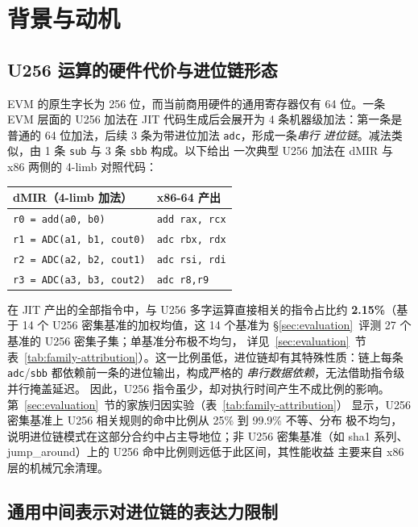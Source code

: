 \section{背景与动机}
\label{sec:problem}

\subsection{U256 运算的硬件代价与进位链形态}

EVM 的原生字长为 256 位，而当前商用硬件的通用寄存器仅有 64 位。一条
EVM 层面的 U256 加法在 JIT 代码生成后会展开为 4 条机器级加法：第一条是
普通的 64 位加法，后续 3 条为带进位加法 \texttt{adc}，形成一条\emph{串行
进位链}。减法类似，由 1 条 \texttt{sub} 与 3 条 \texttt{sbb} 构成。以下给出
一次典型 U256 加法在 dMIR 与 x86 两侧的 4-limb 对照代码：

\begin{center}
\small
\begin{tabular}{@{}l|l@{}}
\textbf{dMIR（4-limb 加法）} & \textbf{x86-64 产出} \\
\hline
\texttt{r0 = add(a0, b0)}   & \texttt{add rax, rcx}  \\
\texttt{r1 = ADC(a1, b1, cout0)} & \texttt{adc rbx, rdx}  \\
\texttt{r2 = ADC(a2, b2, cout1)} & \texttt{adc rsi, rdi}  \\
\texttt{r3 = ADC(a3, b3, cout2)} & \texttt{adc r8,\enspace r9} \\
\end{tabular}
\end{center}

在 JIT 产出的全部指令中，与 U256 多字运算直接相关的指令占比约
\textbf{2.15\%}（基于 14 个 U256 密集基准的加权均值，这 14 个基准为
§\ref{sec:evaluation}~评测 27 个基准的 U256 密集子集；单基准分布极不均匀，
详见~\ref{sec:evaluation}~节表~\ref{tab:family-attribution}）。这一比例虽低，进位链却有其特殊性质：链上每条
\texttt{adc}/\texttt{sbb} 都依赖前一条的进位输出，构成严格的
\emph{串行数据依赖}，无法借助指令级并行掩盖延迟。
因此，U256 指令虽少，却对执行时间产生不成比例的影响。
第~\ref{sec:evaluation}~节的家族归因实验（表~\ref{tab:family-attribution}）
显示，U256 密集基准上 U256 相关规则的命中比例从 25\% 到 99.9\% 不等、分布
极不均匀，说明进位链模式在这部分合约中占主导地位；非 U256 密集基准（如
sha1 系列、jump\_around）上的 U256 命中比例则远低于此区间，其性能收益
主要来自 x86 层的机械冗余清理。

\subsection{通用中间表示对进位链的表达力限制}
\label{sec:expressiveness}

